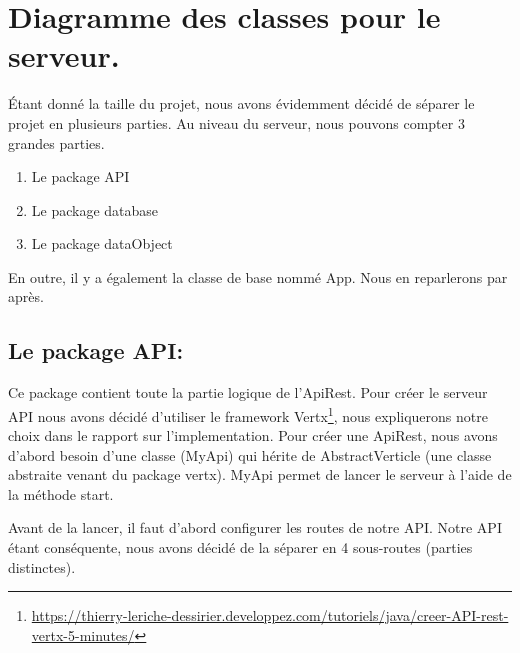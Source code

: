 \section{Diagramme des classes pour le serveur.}

\begin{flushleft}
Étant donné la taille du projet, nous avons évidemment décidé de séparer le projet en plusieurs parties. Au niveau du serveur, nous pouvons compter 3 grandes parties.
\end{flushleft}

\begin{enumerate}[-]
\item Le package API
\item Le package database
\item Le package dataObject
\end{enumerate}

\begin{flushleft}
En outre, il y a également la classe de base nommé App. Nous en reparlerons par après.
\end{flushleft}
\newpage
\subsection{Le package API:}

\begin{flushleft}
Ce package contient toute la partie logique de l'ApiRest. Pour créer le serveur API nous avons décidé d'utiliser le framework Vertx\footnote{\url{https://thierry-leriche-dessirier.developpez.com/tutoriels/java/creer-API-rest-vertx-5-minutes/}}, nous expliquerons notre choix dans le rapport sur l'implementation. Pour créer une ApiRest, nous avons d'abord besoin d'une classe (MyApi) qui hérite de AbstractVerticle (une classe abstraite venant du package vertx). MyApi permet de lancer le serveur à l'aide de la méthode start.
\end{flushleft}

\begin{flushleft}
Avant de la lancer, il faut d'abord configurer les routes de notre API. Notre API étant conséquente, nous avons décidé de la séparer en 4 sous-routes (parties distinctes).
\end{flushleft}

